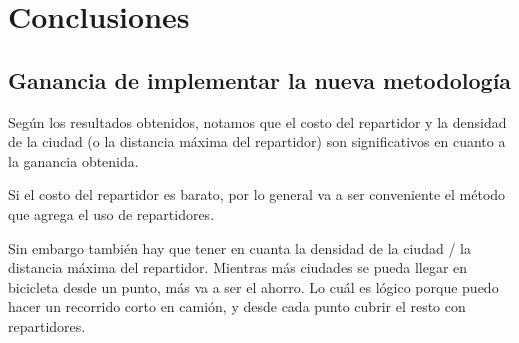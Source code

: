 \documentclass{article}
\begin{document}
        \begin{table}[H]
    \centering
    \caption{Comparación de tiempos para varias instancias}
    \end{table}

    \section{Conclusiones}
    \subsection{Ganancia de implementar la nueva metodología}
    Según los resultados obtenidos, notamos que el costo del repartidor y la densidad de la ciudad (o la distancia máxima del repartidor) son significativos en cuanto a la ganancia obtenida.

    Si el costo del repartidor es barato, por lo general va a ser conveniente el método que agrega el uso de repartidores.

    Sin embargo también hay que tener en cuanta la densidad de la ciudad / la distancia máxima del repartidor. Mientras más ciudades se pueda llegar en bicicleta desde un punto, más va a ser el ahorro. Lo cuál es lógico porque puedo hacer un recorrido corto en camión, y desde cada punto cubrir el resto con repartidores.
\end{document}
